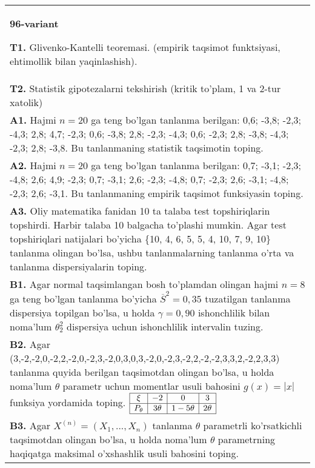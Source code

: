 \documentclass{article}
\begin{document}
\vspace{1cm}


\begin{tabular}{m{17cm}}
\textbf{96-variant}
\newline

\textbf{T1.} 
Glivenko-Kantelli teoremasi. (empirik taqsimot funktsiyasi, ehtimollik bilan yaqinlashish).
\\
\textbf{T2.} 
Statistik gipotezalarni tekshirish (kritik to'plam, 1 va 2-tur xatolik)
\\
\textbf{A1.} 
Hajmi \(n = 20\) ga teng bo'lgan tanlanma berilgan: 0,6; -3,8; -2,3; -4,3; 2,8; 4,7; -2,3; 0,6; -3,8; 2,8; -2,3; -4,3; 0,6; -2,3; 2,8; -3,8; -4,3; -2,3; 2,8; -3,8. Bu tanlanmaning statistik taqsimotin toping.
\\
\textbf{A2.} 
Hajmi \(n = 20\) ga teng bo'lgan tanlanma berilgan: 0,7; -3,1; -2,3; -4,8; 2,6; 4,9; -2,3; 0,7; -3,1; 2,6; -2,3; -4,8; 0,7; -2,3; 2,6; -3,1; -4,8; -2,3; 2,6; -3,1. Bu tanlanmaning empirik taqsimot funksiyasin toping.
\\
\textbf{A3.} 
Oliy matematika fanidan 10 ta talaba test topshiriqlarin topshirdi. Harbir talaba 10 balgacha to'plashi mumkin. Agar test topshiriqlari natijalari bo'yicha \{10, 4, 6, 5, 5, 4, 10, 7, 9, 10\} tanlanma olingan bo'lsa, ushbu tanlanmalarning tanlanma o'rta va tanlanma dispersiyalarin toping.
\\
\textbf{B1.} 
Agar normal taqsimlangan bosh to'plamdan olingan hajmi \(n = 8\) ga teng bo'lgan tanlanma bo'yicha \({\overline{S}}^{2} = 0,35\) tuzatilgan tanlanma dispersiya topilgan bo'lsa, u holda \(\gamma = 0,90\) ishonchlilik bilan noma'lum \(\theta_{2}^{2}\) dispersiya uchun ishonchlilik intervalin tuzing.
\\
\textbf{B2.} 
Agar (3,-2,-2,0,-2,2,-2,0,-2,3,-2,0,3,0,3,-2,0,-2,3,-2,2,-2,-2,3,3,2,-2,2,3,3) tanlanma quyida berilgan taqsimotdan olingan bo'lsa, u holda noma'lum \(\theta\) parametr uchun momentlar usuli bahosini \(g(x) = |x|\) funksiya yordamida toping.
$\begin{array}{|c|c|c|c|}
    \hline
    \xi & -2 & 0 & 3 \\
    \hline
    P_{\theta} & 3\theta & 1 - 5\theta & 2\theta \\
    \hline
\end{array}$
\\
\textbf{B3.} 
Agar \(X^{(n)} = \left( X_{1},...,X_{n} \right)\) tanlanma \(\theta\) parametrli ko'rsatkichli taqsimotdan olingan bo'lsa, u holda noma'lum \(\theta\) parametrning haqiqatga maksimal o'xshashlik usuli bahosini toping.

\end{tabular}
\end{document}
